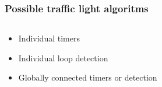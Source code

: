 \documentclass[11pt]{beamer}
\begin{document}
\begin{frame}
\frametitle{Possible traffic light algoritms}
\begin{columns}
    \begin{column}{.5\textwidth}
        \begin{itemize}
            \item Individual timers
            \item Individual loop detection
            \item Globally connected timers or detection
        \end{itemize}
    \end{column}
    \begin{column}{.5\textwidth}
    \end{column}
\end{columns}
\end{frame}
\end{document}
